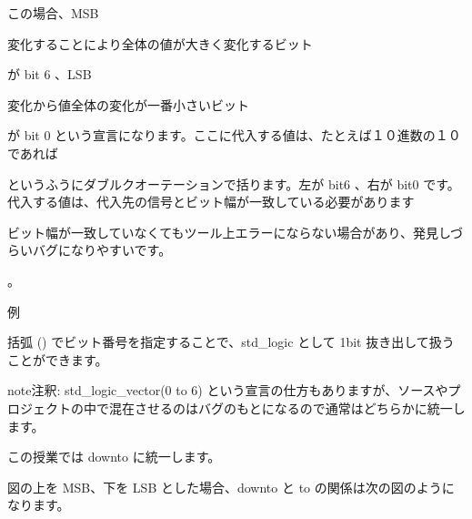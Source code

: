 \documentclass[letterpaper,10pt,dvipdfmx]{sphinxmanual}
\begin{document}
\begin{sphinxVerbatim}[commandchars=\\\{\}]
  
\end{sphinxVerbatim}

この場合、MSB %
\begin{footnote}[1]\sphinxAtStartFootnote
変化することにより全体の値が大きく変化するビット
%
\end{footnote} が bit 6 、LSB %
\begin{footnote}[2]\sphinxAtStartFootnote
変化から値全体の変化が一番小さいビット
%
\end{footnote} が bit 0 という宣言になります。ここに代入する値は、たとえば１０進数の１０であれば

\begin{sphinxVerbatim}[commandchars=\\\{\}]
\end{sphinxVerbatim}

というふうにダブルクオーテーションで括ります。左が bit6 、右が bit0 です。代入する値は、代入先の信号とビット幅が一致している必要があります %
\begin{footnote}[3]\sphinxAtStartFootnote
ビット幅が一致していなくてもツール上エラーにならない場合があり、発見しづらいバグになりやすいです。
%
\end{footnote} 。

例

\begin{sphinxVerbatim}[commandchars=\\\{\}]
  
\end{sphinxVerbatim}

括弧 () でビット番号を指定することで、std\_logic として 1bit 抜き出して扱うことができます。

\begin{sphinxadmonition}{note}{注釈:}
std\_logic\_vector(0 to 6) という宣言の仕方もありますが、ソースやプロジェクトの中で混在させるのはバグのもとになるので通常はどちらかに統一します。

この授業では downto に統一します。

図の上を MSB、下を LSB とした場合、downto と to の関係は次の図のようになります。

\begin{figure}[H]
\centering

\noindent{}
\end{figure}
\end{sphinxadmonition}
\end{document}
